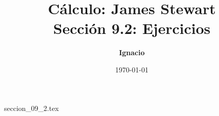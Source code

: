 \documentclass[11pt,spanish,oneside]{report}
\title{\textbf{Cálculo: James Stewart} \\ \Large Sección 9.2: Ejercicios}
\author{\textbf{Ignacio}}
\date{\today}
\begin{document}
\maketitle

{seccion_09_2.tex}
\end{document}
